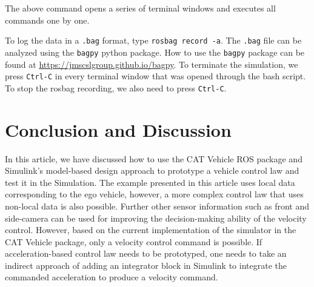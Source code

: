 \documentclass[
]{article}
\begin{document}
The above command opens a series of terminal windows and executes all
commands one by one.

To log the data in a \texttt{.bag} format, type
\texttt{rosbag\ record\ -a}. The \texttt{.bag} file can be analyzed
using the \texttt{bagpy} python package. How to use the \texttt{bagpy}
package can be found at \url{https://jmscslgroup.github.io/bagpy}. To
terminate the simulation, we press \texttt{Ctrl-C} in every terminal
window that was opened through the bash script. To stop the rosbag
recording, we also need to press \texttt{Ctrl-C}.

\hypertarget{conclusion-and-discussion}{%
\section{Conclusion and Discussion}\label{conclusion-and-discussion}}

In this article, we have discussed how to use the CAT Vehicle ROS
package and Simulink's model-based design approach to prototype a
vehicle control law and test it in the Simulation. The example presented
in this article uses local data corresponding to the ego vehicle,
however, a more complex control law that uses non-local data is also
possible. Further other sensor information such as front and side-camera
can be used for improving the decision-making ability of the velocity
control. However, based on the current implementation of the simulator
in the CAT Vehicle package, only a velocity control command is possible.
If acceleration-based control law needs to be prototyped, one needs to
take an indirect approach of adding an integrator block in Simulink to
integrate the commanded acceleration to produce a velocity command.

\printbibliography
\end{document}
